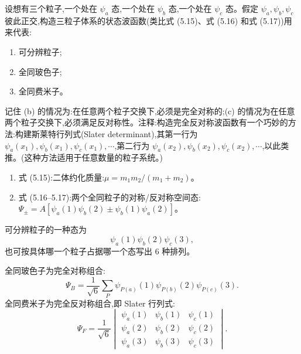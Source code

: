 \begin{question}
设想有三个粒子,一个处在 $\psi_a$ 态,一个处在 $\psi_b$ 态,一个处在 $\psi_c$ 态。假定 $\psi_a,\psi_b,\psi_c$ 彼此正交,构造三粒子体系的状态波函数(类比式 (5.15)、式 (5.16) 和式 (5.17))用来代表:
\begin{enumerate}
\item 可分辨粒子;
\item 全同玻色子;
\item 全同费米子。
\end{enumerate}
记住 (b) 的情况为:在任意两个粒子交换下,必须是完全对称的;(c) 的情况为在任意两个粒子交换下,必须满足反对称性。注释:构造完全反对称波函数有一个巧妙的方法:构建斯莱特行列式(Slater determinant),其第一行为 $\psi_a(x_1),\psi_b(x_1),\psi_c(x_1),\cdots$,第二行为 $\psi_a(x_2),\psi_b(x_2),\psi_c(x_2),\cdots$,以此类推。(这种方法适用于任意数量的粒子系统。)

\par\smallskip
{}
\begin{enumerate}[leftmargin=2.2em,itemsep=0.12em,topsep=0.12em,parsep=0pt]
\item 式 (5.15):二体约化质量:$\mu=m_1m_2/(m_1+m_2)$。
\item 式 (5.16--5.17):两个全同粒子的对称/反对称空间态:$\Psi_\pm=A[\psi_a(1)\psi_b(2)\pm\psi_b(1)\psi_a(2)]$。
\end{enumerate}

\end{question}
\begin{solution}

可分辨粒子的一种态为
\[
\psi_a(1)\psi_b(2)\psi_c(3),
\]
也可按具体哪一个粒子占据哪一个态写出 6 种排列。

全同玻色子为完全对称组合:
\[
\Psi_B=\frac1{\sqrt6}\sum_{P}\psi_{P(a)}(1)\psi_{P(b)}(2)\psi_{P(c)}(3).
\]
全同费米子为完全反对称组合,即 Slater 行列式:
\[
\Psi_F=\frac1{\sqrt{6}}
\begin{vmatrix}
\psi_a(1)&\psi_b(1)&\psi_c(1)\\
\psi_a(2)&\psi_b(2)&\psi_c(2)\\
\psi_a(3)&\psi_b(3)&\psi_c(3)
\end{vmatrix}.
\]

\end{solution}

